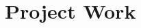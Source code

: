 \chapter{Project Work}  %

\ifpdf
    \graphicspath{{Core/Figs/Raster/}{Core/Figs/PDF/}{Core/Figs/}}
\else
    \graphicspath{{Core/Figs/Vector/}{Core/Figs/}}
\fi

